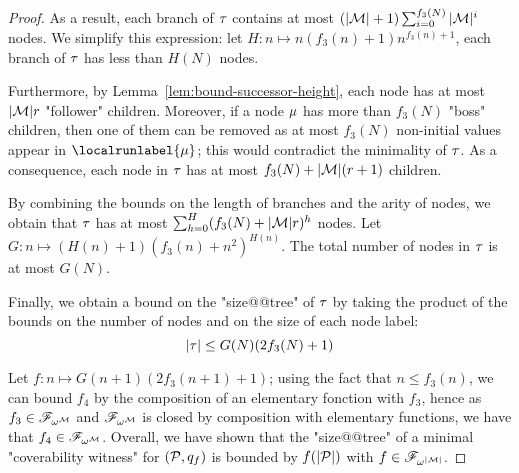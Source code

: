 \begin{proof}
	As a result, each branch of $\tau$ contains at most $(|\mathcal{M}|+1) \sum_{i=0}^{f_3(N)}|\mathcal{M}|^{i}$ nodes. We simplify this expression: let $H: n \mapsto n (f_3(n)+1) n^{f_3(n)+1}$, each branch of $\tau$ has less than $H(N)$ nodes.
	
	Furthermore, by Lemma~\ref{lem:bound-successor-height}, each node has at most $|\mathcal{M}|r$ "follower" children. Moreover, if a node $\mu$ has more than $f_3(N)$ "boss" children, then one of them can be removed as at most $f_3(N)$ non-initial values appear in $\localrunlabel{\node}$; this would contradict the minimality of $\tau$.	
	As a consequence, each node in $\tau$ has at most $f_3(N) + |\mathcal{M}|(r+1)$ children.

	
	By combining the bounds on the length of branches and the arity of nodes, we obtain that $\tau$ has at most $\sum_{h=0}^{H} (f_3(N) + |\mathcal{M}|r)^h$ nodes. Let $G: n \mapsto (H(n)+1)(f_3(n) + n^2)^{H(n)}$. The total number of nodes in $\tau$ is at most $G(N)$.

	Finally, we obtain a bound on the "size@@tree" of $\tau$ by taking the product of the bounds on the number of nodes and on the size of each node label: 
	\[ |\tau| \leq  G(N) (2 f_3(N)+1)\]
	
	Let $f: n \mapsto  G(n+1) (2 f_3(n+1) +1)$; using the fact that $n \leq f_3(n)$, we can bound $f_4$ by the composition of an elementary fonction with $f_3$, hence as $f_3 \in \mathscr{F}_{\omega^{\mathcal{M}}}$ and $\mathscr{F}_{\omega^{\mathcal{M}}}$ is closed by composition with elementary functions, we have that $f_4 \in \mathscr{F}_{\omega^{\mathcal{M}}}$.
	Overall, we have shown that the "size@@tree" of a minimal "coverability witness" for $(\mathcal{P},q_f)$ is bounded by $f(|\mathcal{P}|)$ with $f \in \mathscr{F}_{\omega^{|\mathcal{M}|}}$.
\end{proof}

